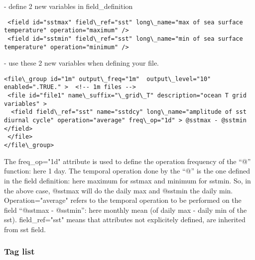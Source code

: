 \documentclass[NEMO_book]{subfiles}
\begin{document}
 - define 2 new variables in field\_definition
\vspace{-20pt}
\begin{alltt}  {{\scriptsize    
\begin{verbatim}
 <field id="sstmax" field\_ref="sst" long\_name="max of sea surface temperature" operation="maximum" />
 <field id="sstmin" field\_ref="sst" long\_name="min of sea surface temperature" operation="minimum" />
\end{verbatim}
}}\end{alltt} 
 - use these 2 new variables when defining your file.  
\vspace{-20pt}
\begin{alltt}  {{\scriptsize    
\begin{verbatim}
<file\_group id="1m" output\_freq="1m"  output\_level="10" enabled=".TRUE." >  <!-- 1m files -->  
 <file id="file1" name\_suffix="\_grid\_T" description="ocean T grid variables" >
  <field field\_ref="sst" name="sstdcy" long\_name="amplitude of sst diurnal cycle" operation="average" freq\_op="1d" > @sstmax - @sstmin </field>
 </file>
</file\_group> 
\end{verbatim}
}}\end{alltt}
The freq\_op="1d" attribute is used to define the operation frequency of the ``@'' function: here 1 day. The temporal operation done by the ``@'' is the one defined in the field definition: here maximum for sstmax and minimum for sstmin. So, in the above case, @sstmax will do the daily max and @sstmin the daily min. Operation="average" refers to the temporal operation to be performed on the field ``@sstmax - @sstmin'': here monthly mean (of daily max - daily min of the sst). field\_ref="sst" means that attributes not explicitely defined, are inherited from sst field.



\subsubsection{Tag list}
\end{document}
